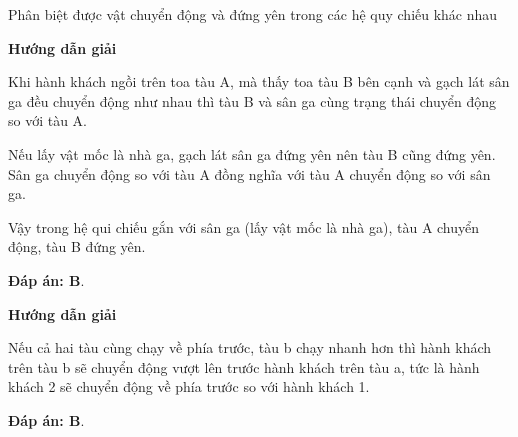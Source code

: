 \begin{dang}{Phân biệt được vật chuyển động và đứng yên trong các hệ quy chiếu khác nhau}
	{	\begin{center}
			\textbf{Hướng dẫn giải}
		\end{center}
		
		Khi hành khách ngồi trên toa tàu A, mà thấy toa tàu B bên cạnh và gạch lát sân ga đều chuyển động như nhau thì tàu B và sân ga cùng trạng thái chuyển động so với tàu A.
		
		Nếu lấy vật mốc là nhà ga, gạch lát sân ga đứng yên nên tàu B cũng đứng yên. Sân ga chuyển động so với tàu A đồng nghĩa với tàu A chuyển động so với sân ga. 
		
		Vậy trong hệ qui chiếu  gắn với sân ga (lấy vật mốc là nhà ga), tàu A chuyển động, tàu B đứng yên.
		
		
		
		\textbf{Đáp án: B}.
	}
	{	\begin{center}
			\textbf{Hướng dẫn giải}
		\end{center}
		
		Nếu cả hai tàu cùng chạy về phía trước, tàu b chạy nhanh hơn thì hành khách trên  tàu b sẽ chuyển động vượt lên trước hành khách trên tàu a, tức là hành khách 2 sẽ chuyển động về phía trước so với hành khách 1. 
		
		\textbf{Đáp án: B}.
	}
\end{dang}
